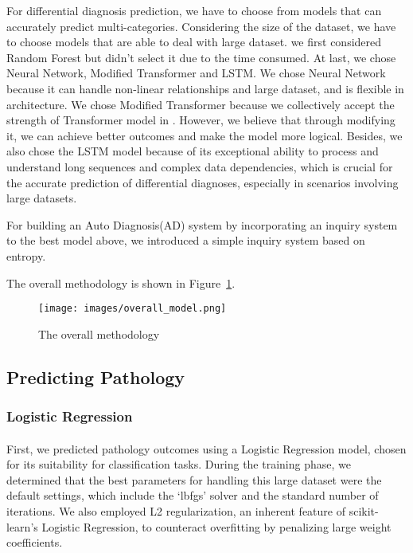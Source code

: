 \documentclass{article}
\begin{document}
For differential diagnosis prediction, we have to choose from models that can accurately predict multi-categories. Considering the size of the dataset, we have to choose models that are able to deal with large dataset. we first considered Random Forest but didn't select it due to the time consumed. At last, we chose Neural Network, Modified Transformer and LSTM. We chose Neural Network because it can handle non-linear relationships and large dataset, and is flexible in architecture. We chose Modified Transformer because we collectively accept the strength of Transformer model in \parencite{Alam_2023}. However, we believe that through modifying it, we can achieve better outcomes and make the model more logical. Besides, we also chose the LSTM model because of its exceptional ability to process and understand long sequences and complex data dependencies, which is crucial for the accurate prediction of differential diagnoses, especially in scenarios involving large datasets. 

For building an Auto Diagnosis(AD) system by incorporating an inquiry system to the best model above, we introduced a simple inquiry system based on entropy.

The overall methodology is shown in Figure~\ref{fig:Figure 1}.

\begin{figure}[h]
\centering
\texttt{[image: images/overall\_model.png]}
\caption{The overall methodology}
\label{fig:Figure 1}
\end{figure}

\subsection{Predicting Pathology}
\subsubsection{Logistic Regression}
\paragraph{ }
First, we predicted pathology outcomes using a Logistic Regression model, chosen for its suitability for classification tasks. During the training phase, we determined that the best parameters for handling this large dataset were the default settings, which include the ‘lbfgs’ solver and the standard number of iterations. We also employed L2 regularization, an inherent feature of scikit-learn’s Logistic Regression, to counteract overfitting by penalizing large weight coefficients.
\end{document}
